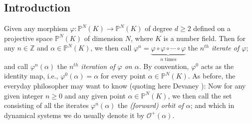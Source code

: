 \documentclass{article}
\theoremstyle{plain}
\theoremstyle{definition}
\begin{document}
\begin{center}
\tableofcontents
\end{center}
\begin{center}
    \section{Introduction} \label{sec1}
\end{center}
\noindent
Given any morphism $\varphi: {\mathbb{P}^N(K)} \rightarrow {\mathbb{P}^N(K)} $ of degree $d \geq 2$ defined on a projective space ${\mathbb{P}^N(K)}$ of dimension $N$, where $K$ is a number field. Then for any $n\in\mathbb{Z}$ and $\alpha\in\mathbb{P}^N(K)$, we then call $\varphi^n = \underbrace{\varphi \circ \varphi \circ \cdots \circ \varphi}_\text{$n$ times}$ the $n^{th}$ \textit{iterate of $\varphi$}; and call $\varphi^n(\alpha)$ the \textit{$n^{th}$ iteration of $\varphi$ on $\alpha$}. By convention, $\varphi^{0}$ acts as the identity map, i.e., $\varphi^{0}(\alpha) = \alpha$ for every point $\alpha\in {\mathbb{P}^N(K)}$. As before, the everyday philosopher may want to know (quoting here Devaney \cite{Dev}):  Now for any given integer $n\geq 0$ and any given point $\alpha\in {\mathbb{P}^N(K)}$, we then call the set consisting of all the iterates $\varphi^n(\alpha)$ the \textit{(forward) orbit of $\alpha$}; and which in dynamical systems we do usually denote it by $\mathcal{O}^{+}(\alpha)$.
\end{document}
